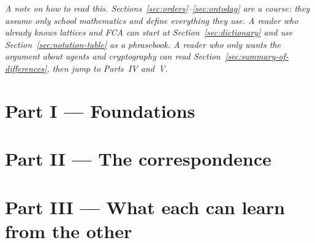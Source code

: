 \documentclass[11pt,a4paper]{article}
\theoremstyle{definition}
\theoremstyle{plain}
\theoremstyle{remark}
\newcommand{\fca}{\textsc{FCA}}
\begin{document}
\vspace{4mm}
\begin{center}
\begin{minipage}{0.86\textwidth}
\small\itshape
A note on how to read this. Sections~\ref{sec:orders}--\ref{sec:ontodag} are a
course: they assume only school mathematics and define everything they use.
A reader who already knows lattices and \fca{} can start at
Section~\ref{sec:dictionary} and use Section~\ref{sec:notation-table} as a
phrasebook. A reader who only wants the argument about agents and
cryptography can read Section~\ref{sec:summary-of-differences}, then jump to
Parts~IV and~V.
\end{minipage}
\end{center}

\clearpage
\tableofcontents
\clearpage

\part*{Part I --- Foundations}







\part*{Part II --- The correspondence}




\part*{Part III --- What each can learn from the other}



\end{document}
